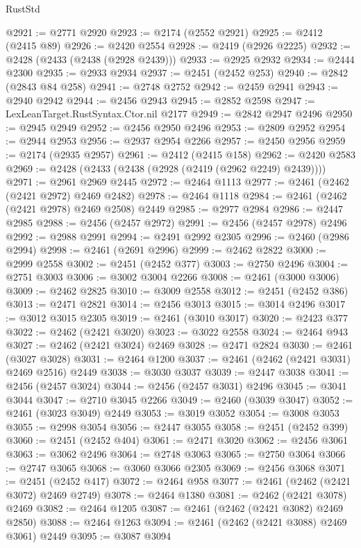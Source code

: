 \begin{lexlean}{RustStd}
\begin{coremodule}
@2921 := @2771 @2920
@2923 := @2174 (@2552 @2921)
@2925 := @2412 (@2415 @89)
@2926 := @2420 @2554
@2928 := @2419 (@2926 @2225)
@2932 := @2428 (@2433 (@2438 (@2928 @2439)))
@2933 := @2925 @2932
@2934 := @2444 @2300
@2935 := @2933 @2934
@2937 := @2451 (@2452 @253)
@2940 := @2842 (@2843 @84 @258)
@2941 := @2748 @2752
@2942 := @2459 @2941
@2943 := @2940 @2942
@2944 := @2456 @2943
@2945 := @2852 @2598
@2947 := LexLeanTarget.RustSyntax.Ctor.nil @2177
@2949 := @2842 @2947 @2496
@2950 := @2945 @2949
@2952 := @2456 @2950 @2496
@2953 := @2809 @2952
@2954 := @2944 @2953
@2956 := @2937 @2954 @2266
@2957 := @2450 @2956
@2959 := @2174 (@2935 @2957)
@2961 := @2412 (@2415 @158)
@2962 := @2420 @2583
@2969 := @2428 (@2433 (@2438 (@2928 (@2419 (@2962 @2249) @2439))))
@2971 := @2961 @2969 @2445
@2972 := @2464 @1113
@2977 := @2461 (@2462 (@2421 @2972) @2469 @2482)
@2978 := @2464 @1118
@2984 := @2461 (@2462 (@2421 @2978) @2469 @2508) @2449
@2985 := @2977 @2984
@2986 := @2447 @2985
@2988 := @2456 (@2457 @2972)
@2991 := @2456 (@2457 @2978) @2496
@2992 := @2988 @2991
@2994 := @2491 @2992 @2305
@2996 := @2460 (@2986 @2994)
@2998 := @2461 (@2691 @2996)
@2999 := @2462 @2822
@3000 := @2999 @2558
@3002 := @2451 (@2452 @377)
@3003 := @2750 @2496
@3004 := @2751 @3003
@3006 := @3002 @3004 @2266
@3008 := @2461 (@3000 @3006)
@3009 := @2462 @2825
@3010 := @3009 @2558
@3012 := @2451 (@2452 @386)
@3013 := @2471 @2821
@3014 := @2456 @3013
@3015 := @3014 @2496
@3017 := @3012 @3015 @2305
@3019 := @2461 (@3010 @3017)
@3020 := @2423 @377
@3022 := @2462 (@2421 @3020)
@3023 := @3022 @2558
@3024 := @2464 @943
@3027 := @2462 (@2421 @3024) @2469
@3028 := @2471 @2824
@3030 := @2461 (@3027 @3028)
@3031 := @2464 @1200
@3037 := @2461 (@2462 (@2421 @3031) @2469 @2516) @2449
@3038 := @3030 @3037
@3039 := @2447 @3038
@3041 := @2456 (@2457 @3024)
@3044 := @2456 (@2457 @3031) @2496
@3045 := @3041 @3044
@3047 := @2710 @3045 @2266
@3049 := @2460 (@3039 @3047)
@3052 := @2461 (@3023 @3049) @2449
@3053 := @3019 @3052
@3054 := @3008 @3053
@3055 := @2998 @3054
@3056 := @2447 @3055
@3058 := @2451 (@2452 @399)
@3060 := @2451 (@2452 @404)
@3061 := @2471 @3020
@3062 := @2456 @3061
@3063 := @3062 @2496
@3064 := @2748 @3063
@3065 := @2750 @3064
@3066 := @2747 @3065
@3068 := @3060 @3066 @2305
@3069 := @2456 @3068
@3071 := @2451 (@2452 @417)
@3072 := @2464 @958
@3077 := @2461 (@2462 (@2421 @3072) @2469 @2749)
@3078 := @2464 @1380
@3081 := @2462 (@2421 @3078) @2469
@3082 := @2464 @1205
@3087 := @2461 (@2462 (@2421 @3082) @2469 @2850)
@3088 := @2464 @1263
@3094 := @2461 (@2462 (@2421 @3088) @2469 @3061) @2449
@3095 := @3087 @3094

\end{coremodule}
\end{lexlean}
